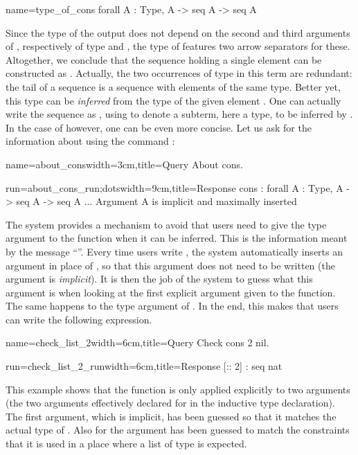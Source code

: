 \begin{coq}{name=type_of_cons}{}
  forall A : Type, A -> seq A -> seq A
\end{coq}
 Since the type of
the output does not depend on the second and third arguments of
, respectively of type  and , the type of
 features two arrow separators for these.
Altogether, we conclude
that the sequence holding a single element  can be
constructed as
. Actually, the two
occurrences of type  in this term are redundant: the tail of a
sequence is a sequence with elements of the same type. Better yet,
this type can be
\emph{inferred} from the type of the given element . One can
actually write the sequence as  , using \C{_} to
denote  a subterm, here a type, to be inferred by \Coq{}. In the case of
 however, one can be even more concise. Let us ask for the
information about  using the command :

\begin{coq}{name=about_cons}{width=3cm,title=Query}
About cons.
$~$
$~$
\end{coq}
\begin{coqout}{run=about_cons_run;dots}{width=9cm,title=Response}
cons : forall A : Type, A -> seq A -> seq A
...
Argument A is implicit and maximally inserted
\end{coqout}

The \Coq{} system provides a mechanism to avoid that
users need to give the type argument to the  function when it
can be inferred.  This is
the information meant by the message ``''.  Every time users write , the system automatically
inserts an argument in place of , so that this argument does not
need to be written (the argument is {\em implicit}).  It is then the
job of the \Coq{} system to guess what this argument is when looking at
the first explicit argument given to the function.  The same happens
to the type argument of .  In the end, this makes that users can
write the following expression.

\begin{coq}{name=check_list_2}{width=6cm,title=Query}
Check cons 2 nil.
\end{coq}
\begin{coqout}{run=check_list_2_run}{width=6cm,title=Response}
[:: 2] : seq nat
\end{coqout}
\index[coq]{\C{(_ :: _)}}
This example shows that the function  is only applied
explicitly to two arguments (the two arguments effectively declared
for  in the inductive type declaration).
The first argument, which is implicit,
has been guessed so that it matches the actual type of .  Also for
 the argument has been guessed to match the constraints
that it is used in a place where a list of type  is expected.

